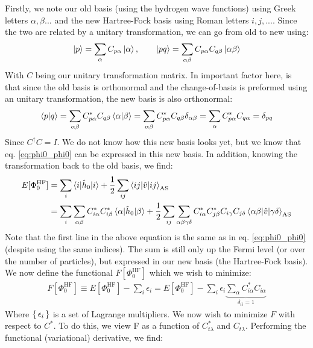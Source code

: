 \documentclass{article}
\newcommand{\inner}[3]{\braket{#1|#2|#3}}
\newcommand{\innerAS}[3]{\inner{#1}{#2}{#3}_{\text{AS}}}
\newcommand{\hnull}{\hat{h}_0}
\newcommand{\hafo}[1]{#1^{\text{HF}}}
\begin{document}
    Firstly, we note our old basis (using the hydrogen wave functions) using Greek letters $\alpha, \beta ...$ and the new Hartree-Fock basis using Roman letters $i, j, ...$. Since the two are related by a unitary transformation, we can go from old to new using:
    \begin{align*}
        \ket{p} = \sum_{\alpha} C_{p\alpha} \ket{\alpha}, \hspace{20px} \ket{pq} = \sum_{\alpha \beta} C_{p\alpha} C_{q\beta} \ket{\alpha\beta}
    \end{align*}
    With $C$ being our unitary transformation matrix. In important factor here, is that since the old basis is orthonormal and the change-of-basis is preformed using an unitary transformation, the new basis is also orthonormal:
    \begin{align*}
        \braket{p|q} = \sum_{\alpha\beta} C^*_{p\alpha}C_{q\beta}\braket{\alpha|\beta} = \sum_{\alpha\beta} C^*_{p\alpha}C_{q\beta}\delta_{\alpha\beta} = \sum_{\alpha} C^*_{p\alpha}C_{q\alpha} = \delta_{pq} 
    \end{align*}
    Since $C^\dagger C = I$. We do not know how this new basis looks yet, but we know that eq. \eqref{eq:phi0_phi0} can be expressed in this new basis. In addition, knowing the transformation back to the old basis, we find:
    \begin{align}
        E[\hafo{\Phi_0}] &= \sum_{i} \inner{i}{\hnull}{i} + \frac{1}{2} \sum_{ij} \innerAS{ij}{\hat{v}}{ij} \nonumber\\
        &= \sum_i \sum_{\alpha\beta} C^*_{i\alpha}C^*_{i\beta} \inner{\alpha}{\hnull}{\beta} + \frac{1}{2}\sum_{ij}\sum_{\alpha\beta\gamma\delta} C^*_{i\alpha}C^*_{j\beta}C_{i\gamma}C_{j\delta} \innerAS{\alpha\beta}{\hat{v}}{\gamma\delta} \label{eq:Egs_HF}
    \end{align} 
    Note that the first line in the above equation is  the same as in eq. \eqref{eq:phi0_phi0} (despite using the same indices). The sum is still only up the Fermi level (or over the number of particles), but expressed in our new basis (the Hartree-Fock basis). We now define the functional $F[\hafo{\Phi_0}]$ which we wish to minimize:
    \begin{align}
        F[\hafo{\Phi_0}] \equiv E[\hafo{\Phi_0}] - \sum_{i} \epsilon_i =  E[\hafo{\Phi_0}] - \sum_{i} \epsilon_i \underbrace{\sum_{\alpha} C^*_{i\alpha}C_{i\alpha}}_{\delta_{ii} = 1}
    \end{align}
    Where $\set{\epsilon_i}$ is a set of Lagrange multipliers. We now wish to minimize $F$ with respect to $C^*$. To do this, we view F as a function of $C^*_{t\lambda}$ and $C_{t\lambda}$. Performing the functional (variational) derivative, we find:
\end{document}
